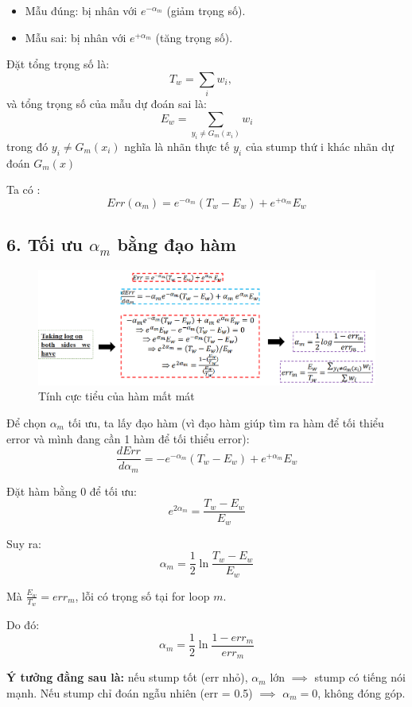 \documentclass[11pt]{article}
\begin{document}
\begin{itemize}
    \item Mẫu đúng: bị nhân với \(e^{-\alpha_m}\) (giảm trọng số).  
    \item Mẫu sai: bị nhân với \(e^{+\alpha_m}\) (tăng trọng số).  \\
\end{itemize}

\noindent Đặt tổng trọng số là:
\[
T_w = \sum_i w_i, \quad 
\]
và tổng trọng số của mẫu dự đoán sai là:
\[
E_w = \sum_{y_i \neq G_m(x_i)} w_i
\] trong đó \(y_i \neq G_m(x_i)\) nghĩa là nhãn thực tế \(y_i\) của stump thứ i khác nhãn dự đoán \(G_m(x) \)


Ta có :
\[
Err(\alpha_m) = e^{-\alpha_m}(T_w - E_w) + e^{+\alpha_m} E_w
\]



\subsection*{6. Tối ưu $\alpha_m$ bằng đạo hàm}
    \begin{figure}[H]
    \centering
    \includegraphics[width=0.7\linewidth]{images/math5.png}
    \caption{Tính cực tiểu của hàm mất mát}
    \end{figure}

Để chọn \(\alpha_m\) tối ưu, ta lấy đạo hàm (vì đạo hàm giúp tìm ra hàm để tối thiểu error và mình đang cần 1 hàm để tối thiểu error):
\[
\frac{dErr}{d\alpha_m} = -e^{-\alpha_m}(T_w - E_w) + e^{+\alpha_m} E_w
\]

Đặt hàm bằng 0 để tối ưu:
\[
e^{2\alpha_m} = \frac{T_w - E_w}{E_w}
\]

Suy ra:
\[
\alpha_m = \frac{1}{2} \ln \frac{T_w - E_w}{E_w}
\]

Mà \(\frac{E_w}{T_w} = err_m\), lỗi có trọng số tại for loop \(m\).

Do đó:
\[
\alpha_m = \frac{1}{2} \ln \frac{1 - err_m}{err_m}
\]

\textbf{Ý tưởng đằng sau là:} nếu stump tốt (err nhỏ), \(\alpha_m\) lớn \(\implies\) stump có tiếng nói mạnh. Nếu stump chỉ đoán ngẫu nhiên (err = 0.5) \(\implies\) \(\alpha_m = 0\), không đóng góp.
\end{document}

